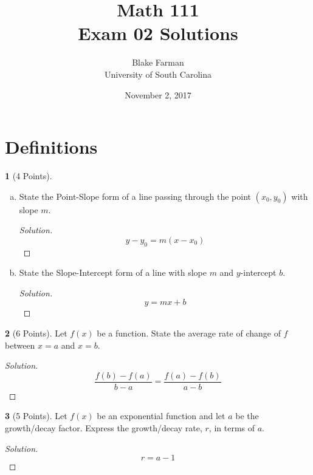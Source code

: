 \documentclass[12pt]{amsart}
\author[Blake Farman]{Blake Farman\\University of South Carolina}
\title[Exam 02 Solutions]{Math 111\\ Exam 02 Solutions}
\date{November 2, 2017}
\begin{document}
\maketitle

\theoremstyle{definition}
\newtheorem{thm}{}
\newtheorem{lem}{Lemma}
\newtheorem{defn}{Definition}

\section{Definitions}

\begin{thm}[4 Points]\label{ex1}
  \begin{enumerate}[(a)]
  \item
    State the Point-Slope form of a line passing through the point $(x_0, y_0)$ with slope $m$.
    \begin{proof}[Solution]
      \[y - y_0 = m(x - x_0)\]
    \end{proof}
  \item
    State the Slope-Intercept form of a line with slope $m$ and $y$-intercept $b$.
    \begin{proof}[Solution]
      \[y = mx + b\]
    \end{proof}
  \end{enumerate}
\end{thm}

\begin{thm}[6 Points]\label{ex2}
  Let $f(x)$ be a function.
  State the average rate of change of $f$ between $x = a$ and $x = b$.
\end{thm}

\begin{proof}[Solution]
  \[\frac{f(b) - f(a)}{b - a} = \frac{f(a) - f(b)}{a - b}\]
\end{proof}

\begin{thm}[5 Points]\label{ex3}
  Let $f(x)$ be an exponential function and let $a$ be the growth/decay factor.
  Express the growth/decay rate, $r$, in terms of $a$.
\end{thm}

\begin{proof}[Solution]
  \[r = a - 1\]
\end{proof}
\end{document}
